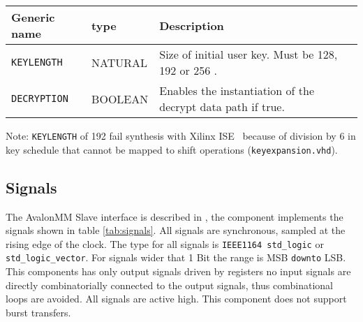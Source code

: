 \documentclass{ruschidoc}
\begin{document}
\begin{tabularx}{\textwidth}{|p{33mm}|p{25mm}|X|}
  \hline
  \bf{Generic name} & \bf{type} & \bf{Description}\\ \hline
  \texttt{KEYLENGTH}  \label{gen:keylength}	& NATURAL   & Size of initial user key. Must be 128, 192 or 256 \footnotemark[1] . \\ \hline
  \texttt{DECRYPTION} \label{gen:decryption}  & BOOLEAN  & Enables the instantiation of the decrypt data path if true. \\
\hline
\end{tabularx}
\label{tab:generics}
Note: \texttt{KEYLENGTH} of 192 fail synthesis with Xilinx ISE \rtm\ because of division by 6 in key schedule that cannot be mapped to shift operations (\texttt{keyexpansion.vhd}).

\subsection{Signals}
\label{sec:signals}
The Avalon\rtm\-MM Slave interface is described in \cite{Altera:Avalon}, the component
implements the signals shown in table \ref{tab:signals}. All signals are synchronous,
sampled at the rising edge of the clock. The type for all signals is \texttt{IEEE1164
    std\_logic} or \texttt{std\_logic\_vector}. For signals wider that 1 Bit the range
is \gls{MSB} \texttt{downto} \gls{LSB}. \\
This components has only output signals driven by registers no input signals are directly combinatorially connected to the
output signals, thus combinational loops are avoided.  All signals are active
high. This component does not support burst transfers.
\end{document}
